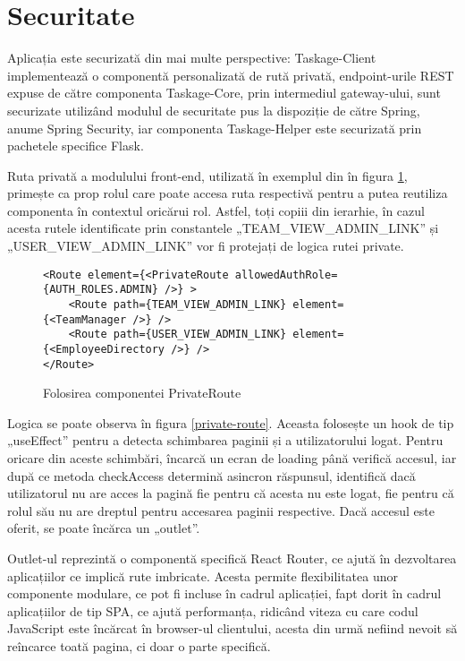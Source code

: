 \section{Securitate}

Aplicația este securizată din mai multe perspective: Taskage-Client implementează o componentă personalizată de rută privată, endpoint-urile REST expuse de către componenta Taskage-Core, prin intermediul gateway-ului, sunt securizate utilizând modulul de securitate pus la dispoziție de către Spring, anume Spring Security, iar componenta Taskage-Helper este securizată prin pachetele specifice Flask.

Ruta privată a modulului front-end, utilizată în exemplul din în figura \ref{private-route-usage}, primește ca prop rolul care poate accesa ruta respectivă pentru a putea reutiliza componenta în contextul oricărui rol. Astfel, toți copiii din ierarhie, în cazul acesta rutele identificate prin constantele „TEAM_VIEW_ADMIN_LINK” și „USER_VIEW_ADMIN_LINK” vor fi protejați de logica rutei private.

\begin{figure}[H]
	\begin{lstlisting}[frame=single, style=java]
<Route element={<PrivateRoute allowedAuthRole={AUTH_ROLES.ADMIN} />} >
	<Route path={TEAM_VIEW_ADMIN_LINK} element={<TeamManager />} />
	<Route path={USER_VIEW_ADMIN_LINK} element={<EmployeeDirectory />} />
</Route>
	\end{lstlisting}
	\caption{Folosirea componentei PrivateRoute}
	\label{private-route-usage}
\end{figure}

Logica se poate observa în figura \ref{private-route}. Aceasta folosește un hook de tip „useEffect” pentru a detecta schimbarea paginii și a utilizatorului logat. Pentru oricare din aceste schimbări, încarcă un ecran de loading până verifică accesul, iar după ce metoda checkAccess determină asincron răspunsul, identifică dacă utilizatorul nu are acces la pagină fie pentru că acesta nu este logat, fie pentru că rolul său nu are dreptul pentru accesarea paginii respective. Dacă accesul este oferit, se poate încărca un „outlet”.

Outlet-ul reprezintă o componentă specifică React Router, ce ajută în dezvoltarea aplicațiilor ce implică rute imbricate. Acesta permite flexibilitatea unor componente modulare, ce pot fi incluse în cadrul aplicației, fapt dorit în cadrul aplicațiilor de tip SPA, ce ajută performanța, ridicând viteza cu care codul JavaScript este încărcat în browser-ul clientului, acesta din urmă nefiind nevoit să reîncarce toată pagina, ci doar o parte specifică. 

